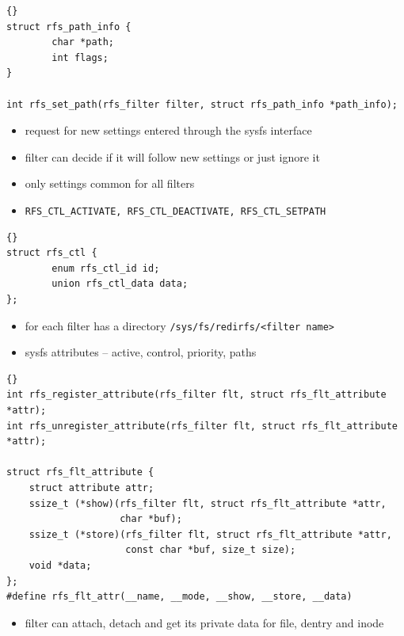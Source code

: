 \documentclass[30pt,a4paper,landscape,headrule,footrule]{foils}
\begin{document}
\begin{lstlisting}[frame=trbl]{}
struct rfs_path_info {
        char *path;
        int flags;
}

int rfs_set_path(rfs_filter filter, struct rfs_path_info *path_info);
\end{lstlisting}

\begin{itemize}
\item request for new settings entered through the sysfs interface
\item filter can decide if it will follow new settings or just ignore it
\item only settings common for all filters
\item \texttt{\small{RFS\_CTL\_ACTIVATE, RFS\_CTL\_DEACTIVATE,
RFS\_CTL\_SETPATH}}
\end{itemize}

\begin{lstlisting}[frame=trbl]{}
struct rfs_ctl {
        enum rfs_ctl_id id;
        union rfs_ctl_data data;
};
\end{lstlisting}


\begin{itemize}
\item for each filter has a directory \texttt{\small{/sys/fs/redirfs/<filter name>}}
\item sysfs attributes -- active, control, priority, paths
\end{itemize}

\begin{lstlisting}[frame=trbl]{}
int rfs_register_attribute(rfs_filter flt, struct rfs_flt_attribute *attr);
int rfs_unregister_attribute(rfs_filter flt, struct rfs_flt_attribute *attr);

struct rfs_flt_attribute {
	struct attribute attr;
	ssize_t (*show)(rfs_filter flt, struct rfs_flt_attribute *attr,
	                char *buf);
	ssize_t (*store)(rfs_filter flt, struct rfs_flt_attribute *attr,
	                 const char *buf, size_t size);
	void *data;
};
#define rfs_flt_attr(__name, __mode, __show, __store, __data)
\end{lstlisting}

\begin{itemize}
\item filter can attach, detach and get its private data for file, dentry and inode
\end{itemize}
\end{document}
